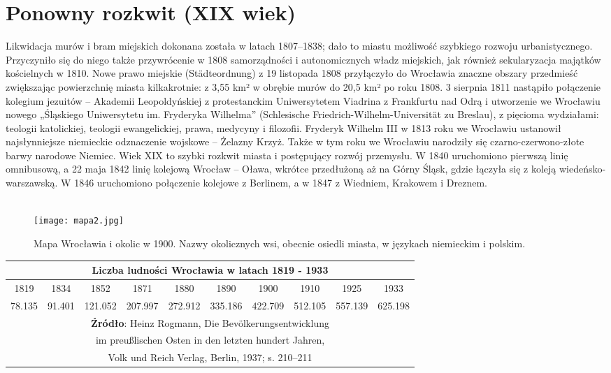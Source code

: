 \documentclass[12pt]{article}
\begin{document}
\section{Ponowny rozkwit (XIX wiek)}

Likwidacja murów i bram miejskich dokonana została w latach 1807–1838; dało to miastu możliwość szybkiego rozwoju urbanistycznego. Przyczyniło się do niego także przywrócenie w 1808 samorządności i autonomicznych władz miejskich, jak również sekularyzacja majątków kościelnych w 1810. Nowe prawo miejskie (Städteordnung) z 19 listopada 1808 przyłączyło do Wrocławia znaczne obszary przedmieść zwiększając powierzchnię miasta kilkakrotnie: z 3,55 km² w obrębie murów do 20,5 km² po roku 1808. 3 sierpnia 1811 nastąpiło połączenie kolegium jezuitów – Akademii Leopoldyńskiej z protestanckim Uniwersytetem Viadrina z Frankfurtu nad Odrą i utworzenie we Wrocławiu nowego „Śląskiego Uniwersytetu im. Fryderyka Wilhelma” (Schlesische Friedrich-Wilhelm-Universität zu Breslau), z pięcioma wydziałami: teologii katolickiej, teologii ewangelickiej, prawa, medycyny i filozofii. Fryderyk Wilhelm III w 1813 roku we Wrocławiu ustanowił najsłynniejsze niemieckie odznaczenie wojskowe – Żelazny Krzyż. Także w tym roku we Wrocławiu narodziły się czarno-czerwono-złote barwy narodowe Niemiec. Wiek XIX to szybki rozkwit miasta i postępujący rozwój przemysłu. W 1840 uruchomiono pierwszą linię omnibusową, a 22 maja 1842 linię kolejową Wrocław – Oława, wkrótce przedłużoną aż na Górny Śląsk, gdzie łączyła się z koleją wiedeńsko-warszawską. W 1846 uruchomiono połączenie kolejowe z Berlinem, a w 1847 z Wiedniem, Krakowem i Dreznem.\\\\ 
\begin{figure}[h]
    \centering
    \texttt{[image: mapa2.jpg]}
    \caption{Mapa Wrocławia i okolic w 1900. Nazwy okolicznych wsi, obecnie osiedli miasta, w językach niemieckim i polskim.}
    \label{fig:mapa2}
\end{figure}
\begin{center}
\begin{tabular}{|c|c|c|c|c|c|c|c|c|c|}
\hline\hline
\multicolumn{10}{|c|}{\textbf{Liczba ludności Wrocławia w latach 1819 - 1933}} \\
\hline
\hline
1819 & 1834 & 1852 & 1871 & 1880 & 1890 & 1900 & 1910 & 1925 & 1933 \\
\hline
\hline
78.135 & 91.401 & 121.052 & 207.997 & 272.912 & 335.186 & 422.709 & 512.105 & 557.139 & 625.198 \\
\hline
\hline
\multicolumn{10}{|c|}{\textbf{Źródło}: Heinz Rogmann, Die Bevölkerungsentwicklung} \\ 
\multicolumn{10}{|c|}{im preußlischen Osten in den letzten hundert Jahren,} \\
\multicolumn{10}{|c|}{Volk und Reich Verlag, Berlin, 1937; s. 210–211} \\
\hline
\hline 
\end{tabular}
\end{center}
\end{document}
